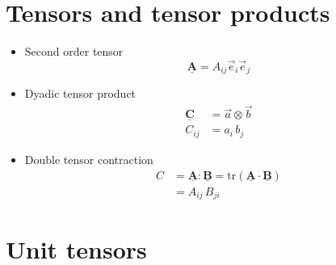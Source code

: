 \documentclass[fleqn]{goose-article}
\newcommand\T[1]{\underline{\bm{{#1}}}}
\begin{document}
\appendix

\vfill\newpage

\section{Tensors and tensor products}
\label{sec:nomenclature:tensor}

\begin{itemize}

    \item Second order tensor
    \begin{equation}
        \T{A} = A_{ij} \vec{e}_i \vec{e}_j
    \end{equation}

    \item Dyadic tensor product
    \begin{align}
        \T{C} &= \vec{a} \otimes \vec{b} \\
        C_{ij} &= a_{i} \, b_{j}
    \end{align}

    \item Double tensor contraction
    \begin{align}
        C
        &= \T{A} : \T{B} = \mathrm{tr} \left( \T{A} \cdot \T{B} \right) \\
        &= A_{ij} \, B_{ji}
    \end{align}

\end{itemize}

\section{Unit tensors}
\label{sec:nomenclature:unit}
\end{document}
